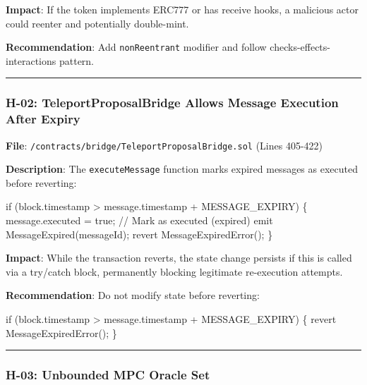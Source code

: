 \documentclass[
]{article}
\newenvironment{Shaded}{}{}
\newcommand{\NormalTok}[1]{#1}
\begin{document}
\textbf{Impact}: If the token implements ERC777 or has receive hooks, a
malicious actor could reenter and potentially double-mint.

\textbf{Recommendation}: Add \texttt{nonReentrant} modifier and follow
checks-effects-interactions pattern.

\begin{center}\rule{0.5\linewidth}{0.5pt}\end{center}

\subsubsection{H-02: TeleportProposalBridge Allows Message Execution
After
Expiry}\label{h-02-teleportproposalbridge-allows-message-execution-after-expiry}

\textbf{File}: \texttt{/contracts/bridge/TeleportProposalBridge.sol}
(Lines 405-422)

\textbf{Description}: The \texttt{executeMessage} function marks expired
messages as executed before reverting:

\begin{Shaded}
\begin{Highlighting}[]
\NormalTok{if (block.timestamp \textgreater{} message.timestamp + MESSAGE\_EXPIRY) \{}
\NormalTok{    message.executed = true; // Mark as executed (expired)}
\NormalTok{    emit MessageExpired(messageId);}
\NormalTok{    revert MessageExpiredError();}
\NormalTok{\}}
\end{Highlighting}
\end{Shaded}

\textbf{Impact}: While the transaction reverts, the state change
persists if this is called via a try/catch block, permanently blocking
legitimate re-execution attempts.

\textbf{Recommendation}: Do not modify state before reverting:

\begin{Shaded}
\begin{Highlighting}[]
\NormalTok{if (block.timestamp \textgreater{} message.timestamp + MESSAGE\_EXPIRY) \{}
\NormalTok{    revert MessageExpiredError();}
\NormalTok{\}}
\end{Highlighting}
\end{Shaded}

\begin{center}\rule{0.5\linewidth}{0.5pt}\end{center}

\subsubsection{H-03: Unbounded MPC Oracle
Set}\label{h-03-unbounded-mpc-oracle-set}
\end{document}
